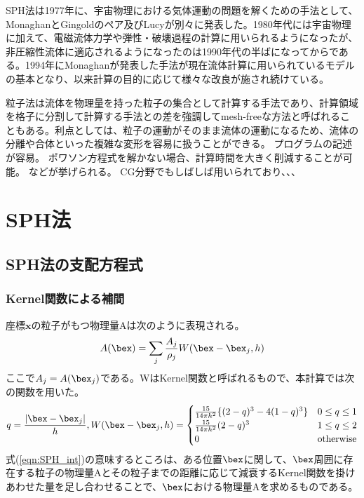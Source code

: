\documentclass[]{jsarticle}
\begin{document}
SPH法は1977年に、宇宙物理における気体運動の問題を解くための手法として、MonaghanとGingold\cite{Gingold1977}のペア及びLucy\cite{Lucy1977}が別々に発表した。1980年代には宇宙物理に加えて、電磁流体力学や弾性・破壊過程の計算に用いられるようになったが、非圧縮性流体に適応されるようになったのは1990年代の半ばになってからである。1994年にMonaghan\cite{Monaghan1994}が発表した手法が現在流体計算に用いられているモデルの基本となり、以来計算の目的に応じて様々な改良が施され続けている。

粒子法は流体を物理量を持った粒子の集合として計算する手法であり、計算領域を格子に分割して計算する手法との差を強調してmesh-freeな方法と呼ばれることもある。利点としては、粒子の運動がそのまま流体の運動になるため、流体の分離や合体といった複雑な変形を容易に扱うことができる。
プログラムの記述が容易。
ポワソン方程式を解かない場合、計算時間を大きく削減することが可能。
などが挙げられる。
CG分野でもしばしば用いられており、、、

\section{SPH法}
\subsection{SPH法の支配方程式}
\subsubsection{Kernel関数による補間}
座標$\bm{x}$の粒子がもつ物理量Aは次のように表現される。 \cite{Becker2007}
\begin{equation}
  \label{eqn:SPH_int}
A(\bex)=\sum_j \frac{A_j}{\rho_j} W(\bex-\bex_j,h)
\end{equation}
ここで$A_j=A(\bex_j)$である。WはKernel関数と呼ばれるもので、本計算では次の関数を用いた。
\begin{equation}
  q=\frac{|\bex-\bex_j|}{h}, 
  W(\bex-\bex_j,h)=\begin{cases}
    \frac{15}{14\pi h^2} \{(2-q)^3-4(1-q)^3\} & \text{$ 0 \leq q \leq 1$}\\
    \frac{15}{14\pi h^2} (2-q)^3 & \text{$1\leq q \leq 2$}\\
    0 & \text{otherwise}
\end{cases}
\end{equation}
式(\ref{eqn:SPH_int})の意味するところは、ある位置$\bex$に関して、$\bex$周囲に存在する粒子の物理量Aとその粒子までの距離に応じて減衰するKernel関数を掛けあわせた量を足し合わせることで、$\bex$における物理量Aを求めるものである。
\end{document}
